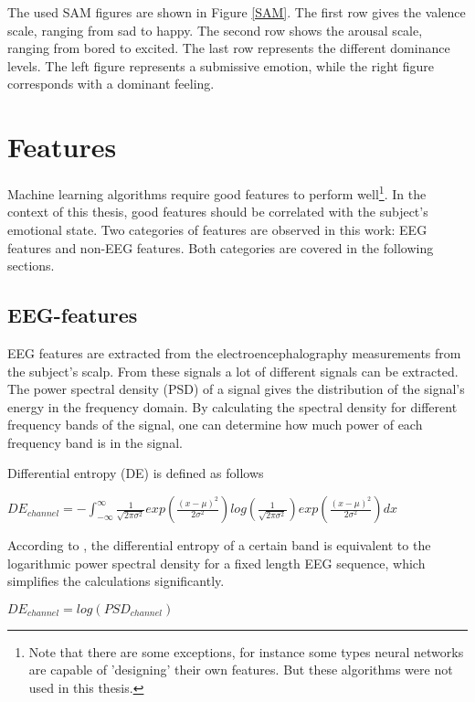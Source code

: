 \npar

The used SAM figures are shown in Figure \ref{SAM}. The first row gives the valence scale, ranging from sad to happy. The second row shows the arousal scale, ranging from bored to excited. The last row represents the different dominance levels. The left figure represents a submissive emotion, while the right figure corresponds with a dominant feeling.


\section{Features}
\label{featuresExplained}
Machine learning algorithms require good features to perform well\footnote{Note that there are some exceptions, for instance some types neural networks are capable of 'designing' their own features\citep{nnfeat}. But these algorithms were not used in this thesis.}. In the context of this thesis, good features should be correlated with the subject's emotional state. Two categories of features are observed in this work: EEG features and non-EEG features. Both categories are covered in the following sections.

\subsection{EEG-features}
EEG features are extracted from the electroencephalography measurements from the subject's scalp. From these signals a lot of different signals can be extracted. The power spectral density (PSD)  of a signal gives the distribution of the signal's energy in the frequency domain. By calculating the spectral density for different frequency bands of the signal, one can determine how much power of each frequency band is in the signal.

\npar

Differential entropy (DE) is defined as follows \citep{killyPaper} \\
\begin{center}
$DE_{channel} = - \int_{-\infty}^{\infty} \frac{1}{\sqrt{2\pi\sigma^2}} exp(\frac{(x-\mu)^2}{2\sigma^2}) log(\frac{1}{\sqrt{2\pi\sigma^2}}) exp(\frac{(x-\mu)^2}{2\sigma^2})dx$
\end{center}
According to \citep{diffEnt}, the differential entropy of a certain band is equivalent to the logarithmic power spectral density for a fixed length EEG sequence, which simplifies the calculations significantly.
\begin{center}
$DE_{channel} = log(PSD_{channel})$
\end{center}

